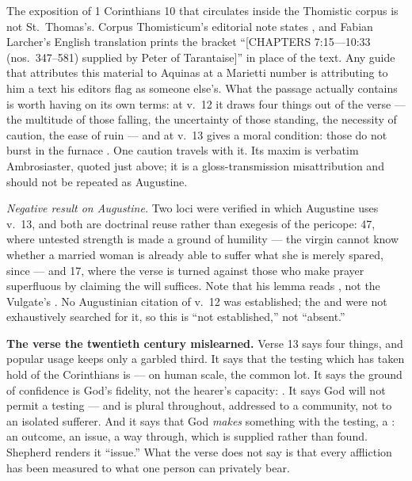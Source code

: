 \begin{witnessnote}
The exposition of 1 Corinthians 10 that circulates inside the Thomistic corpus
is not St.\ Thomas's. Corpus Thomisticum's editorial note states , and Fabian Larcher's English
translation prints the bracket ``[CHAPTERS 7:15---10:33 (nos.\ 347--581)
supplied by Peter of Tarantaise]'' in place of the text. Any guide that
attributes this material to Aquinas at a Marietti number is attributing to him
a text his editors flag as someone else's. What the passage actually contains
is worth having on its own terms: at v.~12 it draws four things out of the
verse --- the multitude of those falling, the uncertainty of those standing,
the necessity of caution, the ease of ruin --- and at v.~13 gives
 a moral condition: those do not burst in the furnace
. One caution travels with it. Its
maxim  is
verbatim Ambrosiaster, quoted just above; it is a gloss-transmission
misattribution and should not be repeated as Augustine.
\end{witnessnote}

\textit{Negative result on Augustine.} Two loci were verified in which
Augustine uses v.~13, and both are doctrinal reuse rather than exegesis of the
pericope:  47, where untested strength is made a
ground of humility --- the virgin cannot know whether a married woman is
already able to suffer what she is merely spared, since  --- and  17, where the
verse is turned against those who make prayer superfluous by claiming the will
suffices. Note that his lemma reads , not the Vulgate's
. No Augustinian citation of v.~12 was established; the
 and  were not exhaustively searched for it,
so this is ``not established,'' not ``absent.''

\textbf{The verse the twentieth century mislearned.} Verse 13 says four
things, and popular usage keeps only a garbled third. It says that the
testing which has taken hold of the Corinthians is  --- on
human scale, the common lot. It says the ground of confidence is God's
fidelity, not the hearer's capacity: . It says
God will not permit a testing  --- and
 is plural throughout, addressed to a community, not to an
isolated sufferer. And it says that God \textit{makes} something with the
testing, a : an outcome, an issue, a way through, which is
supplied rather than found. Shepherd renders it ``issue.'' What the verse does
not say is that every affliction has been measured to what one person can
privately bear.

